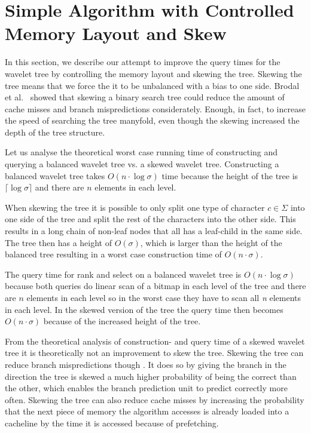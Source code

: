 \section{Simple Algorithm with Controlled Memory Layout and Skew}
\label{sec:memorylayout}
In this section, we describe our attempt to improve the query times for the wavelet tree by controlling the memory layout and skewing the tree.
Skewing the tree means that we force the it to be unbalanced with a bias to one side. 
Brodal et al.~ showed that skewing a binary search tree could reduce the amount of cache misses and branch mispredictions considerately. Enough, in fact, to increase the speed of searching the tree manyfold, even though the skewing increased the depth of the tree structure.

Let us analyse the theoretical worst case running time of constructing and querying a balanced wavelet tree vs. a skewed wavelet tree.
Constructing a balanced wavelet tree takes  $O(n \cdot \log \sigma)$ time because the height of the tree is $\lceil \log \sigma \rceil$ and there are $n$ elements in each level.

When skewing the tree it is possible to only split one type of character $c \in \Sigma$ into one side of the tree and split the rest of the characters into the other side.
This results in a long chain of non-leaf nodes that all has a leaf-child in the same side.
The tree then has a height of $O(\sigma)$, which is larger than the height of the balanced tree resulting in a worst case construction time of $O(n \cdot \sigma)$.

The query time for rank and select on a balanced wavelet tree is $O(n \cdot \log \sigma)$ because both queries do linear scan of a bitmap in each level of the tree and there are $n$ elements in each level so in the worst case they have to scan all \textit{n} elements in each level.
In the skewed version of the tree the query time then becomes $O(n \cdot \sigma)$ because of the increased height of the tree.

From the theoretical analysis of construction- and query time of a skewed wavelet tree it is theoretically not an improvement to skew the tree.
Skewing the tree can reduce branch mispredictions though .
It does so by giving the branch in the direction the tree is skewed a much higher probability of being the correct than the other, which enables the branch prediction unit to predict correctly more often. 
Skewing the tree can also reduce cache misses by increasing the probability that the next piece of memory the algorithm accesses is already loaded into a cacheline by the time it is accessed because of prefetching.

